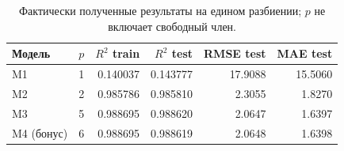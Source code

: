 \begin{table}[H]\centering\small
\begin{tabular}{lrrrrr}\toprule
Модель & $p$ & $R^2$ train & $R^2$ test & RMSE test & MAE test\\\midrule
M1 & 1 & 0.140037 & 0.143777 & 17.9088 & 15.5060\\
M2 & 2 & 0.985786 & 0.985810 & 2.3055 & 1.8270\\
M3 & 5 & 0.988695 & 0.988620 & 2.0647 & 1.6397\\
M4 (бонус) & 6 & 0.988695 & 0.988619 & 2.0648 & 1.6398\\
\bottomrule\end{tabular}
\caption{Фактически полученные результаты на едином разбиении; $p$ не включает свободный член.}
\label{tab:metrics}
\end{table}
